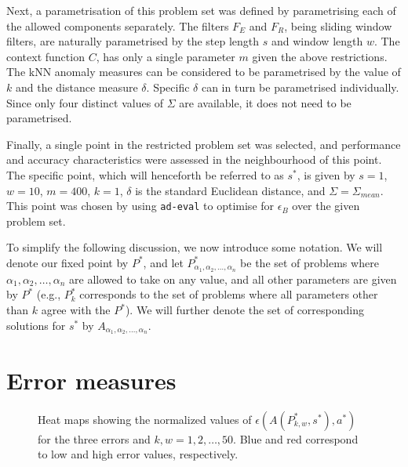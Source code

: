 Next, a parametrisation of this problem set was defined by parametrising each of the allowed components separately. The filters $F_E$ and $F_R$, being sliding window filters, are naturally parametrised by the step length $s$ and window length $w$. The context function $C$, has only a single parameter $m$ given the above restrictions. The kNN anomaly measures can be considered to be parametrised by the value of $k$ and the distance measure $\delta$. Specific $\delta$ can in turn be parametrised individually. Since only four distinct values of $\Sigma$ are available, it does not need to be parametrised.

Finally, a single point in the restricted problem set was selected, and performance and accuracy characteristics were assessed in the neighbourhood of this point. The specific point, which will henceforth be referred to as $s^*$, is given by $s = 1$, $w = 10$, $m = 400$, $k = 1$, $\delta$ is the standard Euclidean distance, and $\Sigma = \Sigma_{mean}$. This point was chosen by using \texttt{ad-eval} to optimise for $\epsilon_B$ over the given problem set.

To simplify the following discussion, we now introduce some notation. We will denote our fixed point by $P^*$, and let $P^*_{\alpha_1, \alpha_2, \dots, \alpha_n}$ be the set of problems where $\alpha_1, \alpha_2, \dots, \alpha_n$ are allowed to take on any value, and all other parameters are given by $P^*$ (e.g., $P^*_k$ corresponds to the set of problems where all parameters other than $k$ agree with the $P^*$). We will further denote the set of corresponding solutions for $s^*$ by $A_{\alpha_1, \alpha_2, \dots, \alpha_n}$.

\section{Error measures}
\label{sect:error_measure_eval}

\begin{figure}
    \centering
    \caption{Heat maps showing the normalized values of $\epsilon(A(P_{k, w}^*, s^*), a^*)$ for the three errors and $k, w = 1,2,\dots,50$. Blue and red correspond to low and high error values, respectively.}
\label{fig:error_heat_maps}
\end{figure}


